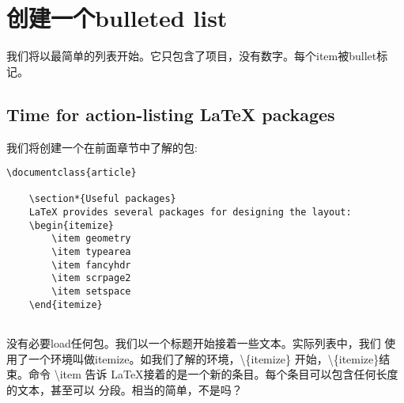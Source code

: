 \section{创建一个bulleted list}
我们将以最简单的列表开始。它只包含了项目，没有数字。每个item被bullet标记。
	\subsection{Time for action-listing LaTeX packages}
	我们将创建一个在前面章节中了解的包:
	\begin{lstlisting}[language={[LaTeX]TeX}]
	\documentclass{article}
	
	\section*{Useful packages}
	LaTeX provides several packages for designing the layout:
	\begin{itemize}
		\item geometry
		\item typearea
		\item fancyhdr
		\item scrpage2
		\item setspace
	\end{itemize}
	
	\end{lstlisting}
	没有必要load任何包。我们以一个标题开始接着一些文本。实际列表中，我们
	使用了一个环境叫做itemize。如我们了解的环境，\textbackslash \{itemize\}
	开始，\textbackslash \{itemize\}结束。命令 \textbackslash item 告诉
	LaTeX接着的是一个新的条目。每个条目可以包含任何长度的文本，甚至可以
	分段。相当的简单，不是吗？
